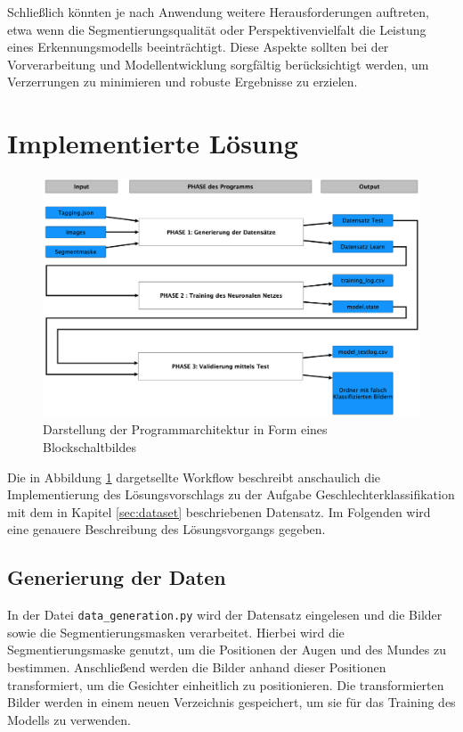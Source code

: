 \documentclass[journal,twoside,web]{ieeecolor}
\begin{document}
Schließlich könnten je nach Anwendung weitere Herausforderungen auftreten, etwa wenn die Segmentierungsqualität oder Perspektivenvielfalt die Leistung eines Erkennungsmodells beeinträchtigt. Diese Aspekte sollten bei der Vorverarbeitung und Modellentwicklung sorgfältig berücksichtigt werden, um Verzerrungen zu minimieren und robuste Ergebnisse zu erzielen.

\section{Implementierte Lösung}

\begin{figure}[H]
    \centerline{\includegraphics[width=\columnwidth]{Architektur.png}}
    \caption{Darstellung der Programmarchitektur in Form eines Blockschaltbildes}
    \label{fig:architecture}
\end{figure}

Die in Abbildung \ref{fig:architecture} dargetsellte Workflow beschreibt anschaulich die Implementierung des Lösungsvorschlags zu der Aufgabe Geschlechterklassifikation mit dem in Kapitel \ref{sec:dataset} beschriebenen Datensatz.
Im Folgenden wird eine genauere Beschreibung des Lösungsvorgangs gegeben.

\subsection{Generierung der Daten}
In der Datei \texttt{data\_generation.py} wird der Datensatz eingelesen und die Bilder sowie die Segmentierungsmasken verarbeitet. Hierbei wird die Segmentierungsmaske genutzt, um die Positionen der Augen und des Mundes zu bestimmen. Anschließend werden die Bilder anhand dieser Positionen transformiert, um die Gesichter einheitlich zu positionieren. Die transformierten Bilder werden in einem neuen Verzeichnis gespeichert, um sie für das Training des Modells zu verwenden.
\end{document}
